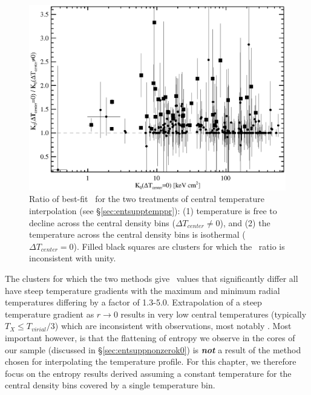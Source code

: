 \begin{figure}[htp]
  \begin{center}
    \begin{minipage}[htp]{0.9\linewidth}
      \includegraphics*[width=\textwidth, trim=5mm 0mm 5mm 5mm, clip]{itplflat_rat.eps}
      \caption[Ratio of best-fit \kna\ for the two treatments of
      central temperature interpolation]{Ratio of best-fit \kna\ for
      the two treatments of central temperature interpolation (see
      \S\ref{sec:entsupptemppr}): (1) temperature is free to decline
      across the central density bins ($\Delta T_{center} \ne 0$), and
      (2) the temperature across the central density bins is
      isothermal ($\Delta T_{center} = 0$). Filled black squares are
      clusters for which the \kna\ ratio is inconsistent with unity.}
      \label{fig:kcomp}
    \end{minipage}
  \end{center}
\end{figure}

The clusters for which the two methods give \kna\ values that
significantly differ all have steep temperature gradients with the
maximum and minimum radial temperatures differing by a factor of
1.3-5.0. Extrapolation of a steep temperature gradient as $r
\rightarrow 0$ results in very low central temperatures (typically
$T_X \leq T_{virial}/3$) which are inconsistent with observations,
most notably \citet{peterson03}. Most important however, is that the
flattening of entropy we observe in the cores of our sample (discussed
in \S\ref{sec:entsuppnonzerok0}) is {\bfseries\em{not}} a result of the
method chosen for interpolating the temperature profile. For this
chapter, we therefore focus on the entropy results derived assuming a
constant temperature for the central density bins covered by a single
temperature bin.

